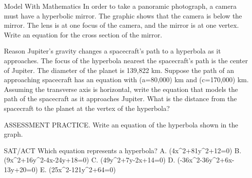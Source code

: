 \documentclass{article}
\newenvironment{practice}[2]{}{}        %
\newcommand{\answer}[1]{}               %
\newcommand{\placeholder}[2]{}          %
\newcommand{\te}[1]{}                   %
\begin{document}
\begin{practice}{32}{2}
Model With Mathematics In order to take a panoramic photograph, a camera must have a hyperbolic mirror. The graphic shows that the camera is below the mirror. The lens is at one focus of the camera, and the mirror is at one vertex. Write an equation for the cross section of the mirror.
\placeholder{illustration}{Camera below blue hyperbolic mirror, white vertical segment joining white dot at mirror bottom labeled Vertex: (0,2) and white dot at lens top labeled Focus: (0,-2.5).}
\answer{(\frac{y^2}{4}-\frac{x^2}{2.25}=1)}
\end{practice}
\begin{practice}{33}{2}
Reason Jupiter's gravity changes a spacecraft's path to a hyperbola as it approaches. The focus of the hyperbola nearest the spacecraft's path is the center of Jupiter. The diameter of the planet is 139,822 km. Suppose the path of an approaching spacecraft has an equation with (a=80,000) km and (c=170,000) km. Assuming the transverse axis is horizontal, write the equation that models the path of the spacecraft as it approaches Jupiter. What is the distance from the spacecraft to the planet at the vertex of the hyperbola?
\answer{(\frac{x^2}{6,400,000,000}-\frac{y^2}{22,500,000,000}=1); 20,089 km}
\end{practice}
\begin{practice}{34}{1}
ASSESSMENT PRACTICE. Write an equation of the hyperbola shown in the graph.
\placeholder{graph}{Unit grid [-5,5] both axes, black x/y axes with arrows, O origin. Printed x tick labels -4,-2,2,5 (5 at x=4); y labels 8 at y=4,2,-2,-4. Red vertical hyperbola with vertices (0,+/-1), four arrows and red filled foci (0,+/-2).}
\answer{(\frac{y^2}{1}-\frac{x^2}{3}=1)}
\te{Printed graph labels 8 at the upper y=4 gridline and 5 at the x=4 gridline; likely 4 in each position.}
\end{practice}
\begin{practice}{35}{1}
SAT/ACT Which equation represents a hyperbola?
A. (4x^2+81y^2+12=0)
B. (9x^2+16y^2-4x-24y+18=0)
C. (49y^2+7y-2x+14=0)
D. (-36x^2-36y^2+6x-13y+20=0)
E. (25x^2-121y^2+64=0)
\answer{E}
\end{practice}
\end{document}
